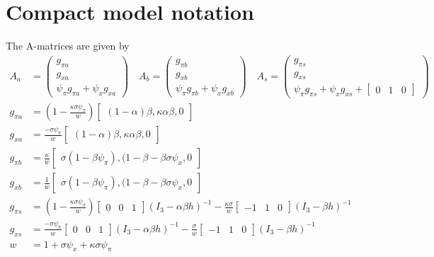 \documentclass[11pt]{article}
\renewcommand{\[}{\begin{equation}}
\renewcommand{\]}{\end{equation}}
\begin{document}
\newpage
\appendix



\section{Compact model notation}\label{app_compact} 
The A-matrices are given by
\begin{align}
A_a & = \begin{pmatrix} g_{\pi a} \\ g_{x a} \\ \psi_{\pi}g_{\pi a} + \psi_xg_{x a}
\end{pmatrix}
\quad A_b = \begin{pmatrix} g_{\pi b} \\ g_{x b} \\ \psi_{\pi}g_{\pi b} + \psi_xg_{x b}
\end{pmatrix}
 \quad A_s = \begin{pmatrix} g_{\pi s} \\ g_{x s} \\ \psi_{\pi}g_{\pi s} + \psi_xg_{x s} + \begin{bmatrix} 0 & 1& 0\end{bmatrix}
\end{pmatrix} \\
g_{\pi a} & =(1-\frac{\kappa\sigma\psi_{\pi}}{w} )  \begin{bmatrix}(1-\alpha)\beta, \kappa\alpha\beta, 0 \end{bmatrix} \\
g_{x a} & =  \frac{-\sigma\psi_{\pi}}{w} \begin{bmatrix}(1-\alpha)\beta, \kappa\alpha\beta, 0 \end{bmatrix}\\
g_{\pi b} & = \frac{\kappa}{w} \begin{bmatrix}\sigma(1-\beta\psi_{\pi}), (1-\beta-\beta\sigma\psi_x, 0 \end{bmatrix}\\
g_{x b} & = \frac{1}{w} \begin{bmatrix}\sigma(1-\beta\psi_{\pi}), (1-\beta-\beta\sigma\psi_x, 0 \end{bmatrix} \\
g_{\pi s} & = (1-\frac{\kappa\sigma\psi_{\pi}}{w} )\begin{bmatrix} 0&0&1 \end{bmatrix} (I_3 - \alpha\beta h)^{-1} -\frac{\kappa\sigma}{w}\begin{bmatrix} -1&1&0 \end{bmatrix} (I_3 -\beta h)^{-1}\\
g_{x s} & =  \frac{-\sigma\psi_{\pi}}{w} \begin{bmatrix} 0&0&1 \end{bmatrix}(I_3 - \alpha\beta h)^{-1}  -\frac{\sigma}{w}\begin{bmatrix} -1&1&0 \end{bmatrix}(I_3 -\beta h)^{-1}\\
w & = 1+\sigma\psi_x +\kappa\sigma\psi_{\pi}
\end{align}
\end{document}
